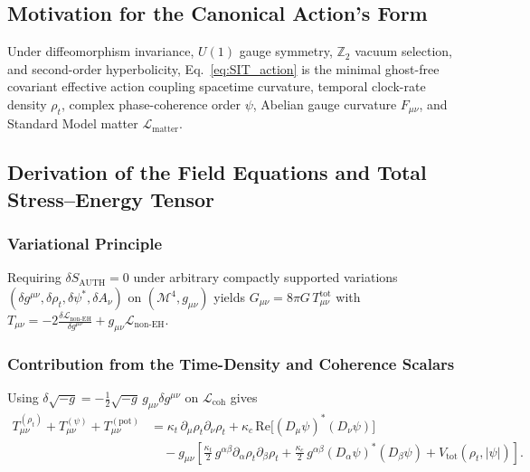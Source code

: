 \subsection{Motivation for the Canonical Action's Form}

Under diffeomorphism invariance, $U(1)$ gauge symmetry, $\mathbb{Z}_2$ vacuum selection, and second-order hyperbolicity, Eq.~\eqref{eq:SIT_action} is the minimal ghost-free covariant effective action coupling spacetime curvature, temporal clock-rate density $\rho_t$, complex phase-coherence order $\psi$, Abelian gauge curvature $F_{\mu\nu}$, and Standard Model matter $\mathcal{L}_{\mathrm{matter}}$.

\subsection{Derivation of the Field Equations and Total Stress--Energy Tensor}

\subsubsection{Variational Principle}

Requiring $\delta S_{\mathrm{AUTH}} = 0$ under arbitrary compactly supported variations $(\delta g^{\mu\nu}, \delta\rho_t, \delta\psi^*, \delta A_\nu)$ on $(\mathcal{M}^4, g_{\mu\nu})$ yields $G_{\mu\nu} = 8\pi G\,T_{\mu\nu}^{\mathrm{tot}}$ with $T_{\mu\nu} = -2\frac{\delta\mathcal{L}_{\mathrm{non\text{-}EH}}}{\delta g^{\mu\nu}} + g_{\mu\nu}\mathcal{L}_{\mathrm{non\text{-}EH}}$.

\subsubsection{Contribution from the Time-Density and Coherence Scalars}

Using $\delta\sqrt{-g} = -\frac{1}{2}\sqrt{-g}\,g_{\mu\nu}\delta g^{\mu\nu}$ on $\mathcal{L}_{\mathrm{coh}}$ gives
\begin{align}
T_{\mu\nu}^{(\rho_t)} + T_{\mu\nu}^{(\psi)} + T_{\mu\nu}^{(\mathrm{pot})}
&= \kappa_t\,\partial_\mu\rho_t\partial_\nu\rho_t
  + \kappa_c\,\mathrm{Re}\bigl[(D_\mu\psi)^*(D_\nu\psi)\bigr]
  \nonumber\\
&\quad
  - g_{\mu\nu}\left[
    \frac{\kappa_t}{2}\,g^{\alpha\beta}\partial_\alpha\rho_t\partial_\beta\rho_t
    + \frac{\kappa_c}{2}\,g^{\alpha\beta}(D_\alpha\psi)^*(D_\beta\psi)
    + V_{\mathrm{tot}}(\rho_t,|\psi|)
  \right].
\label{eq:T_scalar_combined_sec8}
\end{align}

